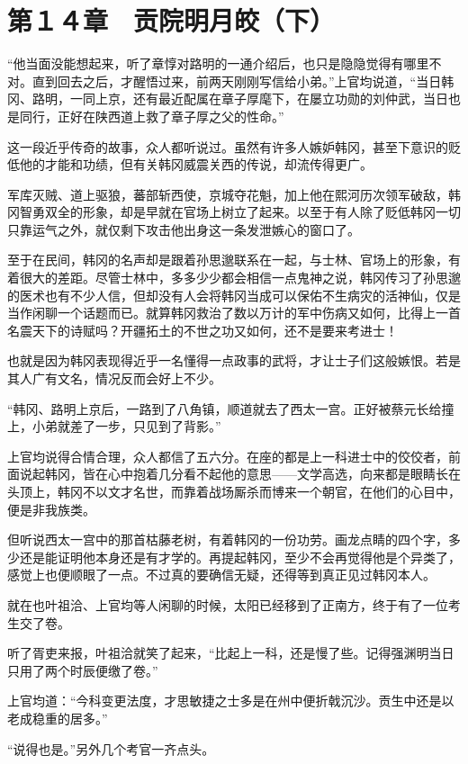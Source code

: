 \section{第１４章　贡院明月皎（下）}

“他当面没能想起来，听了章惇对路明的一通介绍后，也只是隐隐觉得有哪里不对。直到回去之后，才醒悟过来，前两天刚刚写信给小弟。”上官均说道，“当日韩冈、路明，一同上京，还有最近配属在章子厚麾下，在屡立功勋的刘仲武，当日也是同行，正好在陕西道上救了章子厚之父的性命。”

这一段近乎传奇的故事，众人都听说过。虽然有许多人嫉妒韩冈，甚至下意识的贬低他的才能和功绩，但有关韩冈威震关西的传说，却流传得更广。

军库灭贼、道上驱狼，蕃部斩西使，京城夺花魁，加上他在熙河历次领军破敌，韩冈智勇双全的形象，却是早就在官场上树立了起来。以至于有人除了贬低韩冈一切只靠运气之外，就仅剩下攻击他出身这一条发泄嫉心的窗口了。

至于在民间，韩冈的名声却是跟着孙思邈联系在一起，与士林、官场上的形象，有着很大的差距。尽管士林中，多多少少都会相信一点鬼神之说，韩冈传习了孙思邈的医术也有不少人信，但却没有人会将韩冈当成可以保佑不生病灾的活神仙，仅是当作闲聊一个话题而已。就算韩冈救治了数以万计的军中伤病又如何，比得上一首名震天下的诗赋吗？开疆拓土的不世之功又如何，还不是要来考进士！

也就是因为韩冈表现得近乎一名懂得一点政事的武将，才让士子们这般嫉恨。若是其人广有文名，情况反而会好上不少。

“韩冈、路明上京后，一路到了八角镇，顺道就去了西太一宫。正好被蔡元长给撞上，小弟就差了一步，只见到了背影。”

上官均说得合情合理，众人都信了五六分。在座的都是上一科进士中的佼佼者，前面说起韩冈，皆在心中抱着几分看不起他的意思——文学高选，向来都是眼睛长在头顶上，韩冈不以文才名世，而靠着战场厮杀而博来一个朝官，在他们的心目中，便是非我族类。

但听说西太一宫中的那首枯藤老树，有着韩冈的一份功劳。画龙点睛的四个字，多少还是能证明他本身还是有才学的。再提起韩冈，至少不会再觉得他是个异类了，感觉上也便顺眼了一点。不过真的要确信无疑，还得等到真正见过韩冈本人。

就在也叶祖洽、上官均等人闲聊的时候，太阳已经移到了正南方，终于有了一位考生交了卷。

听了胥吏来报，叶祖洽就笑了起来，“比起上一科，还是慢了些。记得强渊明当日只用了两个时辰便缴了卷。”

上官均道：“今科变更法度，才思敏捷之士多是在州中便折戟沉沙。贡生中还是以老成稳重的居多。”

“说得也是。”另外几个考官一齐点头。

